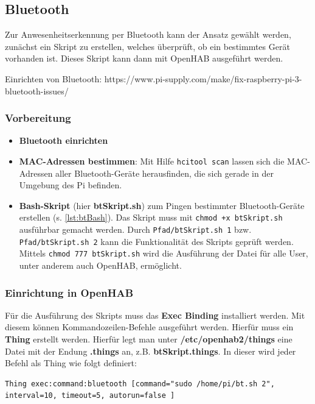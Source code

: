 \subsection{Bluetooth}
Zur Anwesenheitserkennung per Bluetooth kann der Ansatz gewählt werden, zunächst ein Skript zu erstellen, welches überprüft, ob ein bestimmtes Gerät vorhanden ist. Dieses Skript kann dann mit OpenHAB ausgeführt werden.

Einrichten von Bluetooth:
https://www.pi-supply.com/make/fix-raspberry-pi-3-bluetooth-issues/
\subsubsection{Vorbereitung}
\begin{itemize}
	\item \textbf{Bluetooth einrichten}
	\item \textbf{MAC-Adressen bestimmen}: Mit Hilfe \texttt{hcitool scan} lassen sich die MAC-Adressen aller Bluetooth-Geräte herausfinden, die sich gerade in der Umgebung des Pi befinden.
	\item \textbf{Bash-Skript} (hier \textbf{btSkript.sh}) zum Pingen bestimmter Bluetooth-Geräte erstellen (s. \autoref{lst:btBash}). Das Skript muss mit \texttt{chmod +x btSkript.sh} ausführbar gemacht werden. Durch \texttt{Pfad/btSkript.sh 1} bzw. \texttt{Pfad/btSkript.sh 2} kann die Funktionalität des Skripts geprüft werden. Mittels \texttt{chmod 777 btSkript.sh} wird die Ausführung der Datei für alle User, unter anderem auch OpenHAB, ermöglicht.
\end{itemize}




\subsubsection{Einrichtung in OpenHAB}

Für die Ausführung des Skripts muss das \textbf{Exec Binding} installiert werden. Mit diesem können Kommandozeilen-Befehle ausgeführt werden. Hierfür muss ein \textbf{Thing} erstellt werden. Hierfür legt man unter \textbf{/etc/openhab2/things} eine Datei mit der Endung \textbf{.things} an, z.B. \textbf{btSkript.things}. In dieser wird jeder Befehl als Thing wie folgt definiert:
\begin{lstlisting}
Thing exec:command:bluetooth [command="sudo /home/pi/bt.sh 2", interval=10, timeout=5, autorun=false ]
\end{lstlisting}

